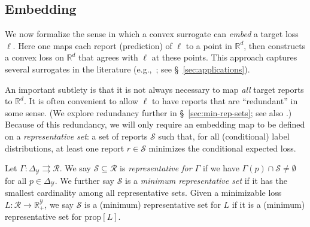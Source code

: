 \documentclass[twoside,11pt]{article}
\newcommand{\reals}{\mathbb{R}}
\newcommand{\prop}[1]{\mathrm{prop}[#1]}
\newcommand{\simplex}{\Delta_\Y}
\newcommand{\R}{\mathcal{R}}
\newcommand{\Sc}{\mathcal{S}}
\newcommand{\Y}{\mathcal{Y}}
\newcommand{\toto}{\rightrightarrows}
\begin{document}
\subsection{Embedding}
\label{sec:embedding}

We now formalize the sense in which a convex surrogate can \emph{embed} a target loss $\ell$.
Here one maps each report (prediction) of $\ell$ to a point in $\reals^d$, then constructs a convex loss on $\reals^d$ that agrees with $\ell$ at these points.
This approach captures several surrogates in the literature (e.g.,~\citep{ramaswamy2015hierarchical,ramaswamy2016convex,lapin2015top,wang2020weston}; see \S~\ref{sec:applications}).

An important subtlety is that it is not always necessary to map \emph{all} target reports to $\reals^d$.
It is often convenient to allow $\ell$ to have reports that are ``redundant'' in some sense. (We explore redundancy further in \S~\ref{sec:min-rep-sets}; see also \citet{wang2020weston}.)
Because of this redundancy, we will only require an embedding map to be defined on a \emph{representative set}: a set of reports $\Sc$ such that, for all (conditional) label distributions, at least one report $r\in\Sc$ minimizes the conditional expected loss.
\begin{definition}
  Let $\Gamma:\simplex\toto\R$.
  We say $\Sc \subseteq \R$ is \emph{representative for $\Gamma$} if we have $\Gamma(p) \cap \Sc \neq \emptyset$ for all $p\in \simplex$.
  We further say $\Sc$ is a \emph{minimum representative set} if it has the smallest cardinality among all representative sets.
  Given a minimizable loss $L:\R\to\reals^\Y_+$, we say $\Sc$ is a (minimum) representative set for $L$ if it is a (minimum) representative set for $\prop L$.
\end{definition}
\end{document}
